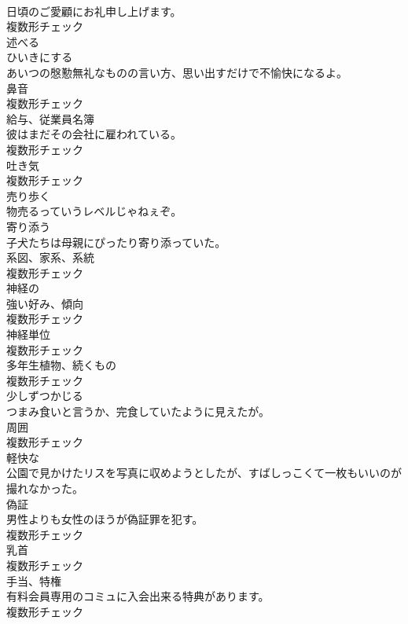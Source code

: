\documentclass[8pt]{extreport}
\begin{document}
\begin{CJK}{UTF8}{min}
\\	日頃のご愛顧にお礼申し上げます。	
\\	複数形チェック
\\	[動詞]	述べる	
\\	[動詞]	ひいきにする	
\\	あいつの慇懃無礼なものの言い方、思い出すだけで不愉快になるよ。	
\\	[名詞]	鼻音	
\\	複数形チェック
\\	[名詞]	給与、従業員名簿	
\\	彼はまだその会社に雇われている。	
\\	複数形チェック
\\	[名詞]	吐き気	
\\	複数形チェック
\\	[動詞]	売り歩く	
\\	物売るっていうレベルじゃねぇぞ。	
\\	[動詞]	寄り添う	
\\	子犬たちは母親にぴったり寄り添っていた。	
\\	[名詞]	系図、家系、系統	
\\	複数形チェック
\\	[形容詞]	神経の	
\\	[名詞]	強い好み、傾向	
\\	複数形チェック
\\	[名詞]	神経単位	
\\	複数形チェック
\\	[名詞]	多年生植物、続くもの	
\\	複数形チェック
\\	[動詞]	少しずつかじる	
\\	つまみ食いと言うか、完食していたように見えたが。	
\\	[名詞]	周囲	
\\	複数形チェック
\\	[形容詞]	軽快な	
\\	公園で見かけたリスを写真に収めようとしたが、すばしっこくて一枚もいいのが撮れなかった。	
\\	[名詞]	偽証	
\\	男性よりも女性のほうが偽証罪を犯す。	
\\	複数形チェック
\\	[名詞]	乳首	
\\	複数形チェック
\\	[名詞]	手当、特権	
\\	有料会員専用のコミュに入会出来る特典があります。	
\\	複数形チェック

\end{CJK}
\end{document}
